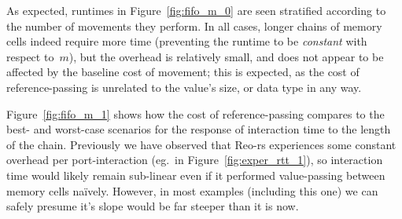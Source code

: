 As expected, runtimes in Figure~\ref{fig:fifo_m_0} are seen stratified according to the number of movements they perform. In all cases, longer chains of memory cells indeed require more time (preventing the runtime to be \textit{constant} with respect to~$m$), but the overhead is relatively small, and does not appear to be affected by the baseline cost of movement; this is expected, as the cost of reference-passing is unrelated to the value's size, or data type in any way.

Figure~\ref{fig:fifo_m_1} shows how the cost of reference-passing compares to the best- and worst-case scenarios for the response of interaction time to the length of the chain. Previously we have observed that Reo-rs experiences some constant overhead per port-interaction (eg.\ in Figure~\ref{fig:exper_rtt_1}), so interaction time would likely remain sub-linear even if it performed value-passing between memory cells na\"ively. However, in most examples (including this one) we can safely presume it's slope would be far steeper than it is now.

